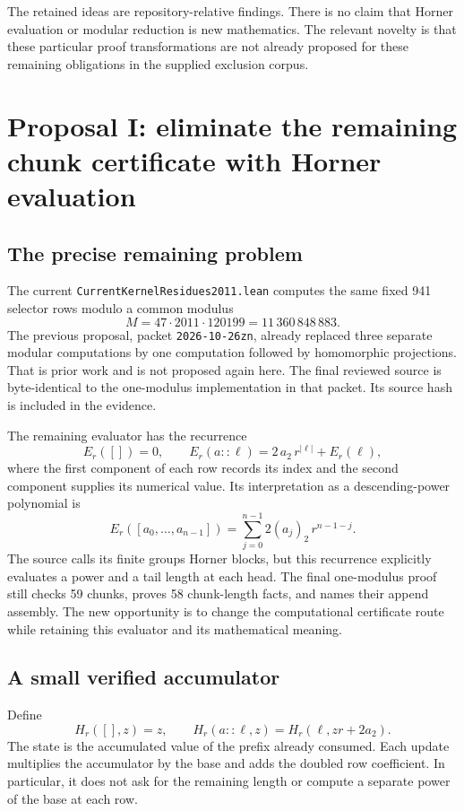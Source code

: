 \documentclass[11pt,a4paper]{article}
\newcommand{\code}[1]{\texttt{#1}}
\begin{document}
The retained ideas are repository-relative findings. There is no claim that Horner evaluation or modular reduction is new mathematics. The relevant novelty is that these particular proof transformations are not already proposed for these remaining obligations in the supplied exclusion corpus.

\section{Proposal I: eliminate the remaining chunk certificate with Horner evaluation}

\subsection{The precise remaining problem}

The current \code{CurrentKernelResidues2011.lean} computes the same fixed 941 selector rows modulo a common modulus
\[
 M=47\cdot2011\cdot120199=11\,360\,848\,883.
\]
The previous proposal, packet \code{2026-10-26zn}, already replaced three separate modular computations by one computation followed by homomorphic projections. That is prior work and is not proposed again here. The final reviewed source is byte-identical to the one-modulus implementation in that packet. Its source hash is included in the evidence.\cite{kernel,zn}

The remaining evaluator has the recurrence
\[
 E_r([])=0,\qquad
 E_r(a::\ell)=2\,a_2\,r^{|\ell|}+E_r(\ell),
\]
where the first component of each row records its index and the second component supplies its numerical value. Its interpretation as a descending-power polynomial is
\[
 E_r([a_0,\ldots,a_{n-1}])
 =\sum_{j=0}^{n-1}2(a_j)_2\,r^{n-1-j}.
\]
The source calls its finite groups Horner blocks, but this recurrence explicitly evaluates a power and a tail length at each head. The final one-modulus proof still checks 59 chunks, proves 58 chunk-length facts, and names their append assembly. The new opportunity is to change the computational certificate route while retaining this evaluator and its mathematical meaning.

\subsection{A small verified accumulator}

Define
\[
 H_r([],z)=z,\qquad
 H_r(a::\ell,z)=H_r(\ell,zr+2a_2).
\]
The state is the accumulated value of the prefix already consumed. Each update multiplies the accumulator by the base and adds the doubled row coefficient. In particular, it does not ask for the remaining length or compute a separate power of the base at each row.
\end{document}
